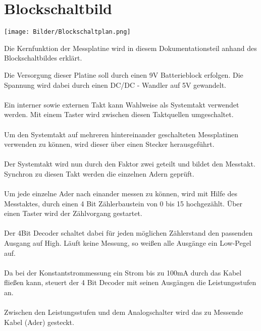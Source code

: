 \documentclass[a4paper,11pt]{scrartcl}
\begin{document}
\section{Blockschaltbild}
	
\begin{center}
\texttt{[image: Bilder/Blockschaltplan.png]}
\end{center}

\newpage

\begin{center}
Die Kernfunktion der Messplatine wird in diesem Dokumentationsteil anhand des Blockschaltbildes erklärt. 
\end{center}

Die Versorgung dieser Platine soll durch einen 9V Batterieblock erfolgen. Die Spannung wird dabei durch einen DC/DC - Wandler auf 5V gewandelt.
\\
\\
Ein interner sowie externen Takt kann Wahlweise als Systemtakt verwendet werden. Mit einem Taster wird zwischen diesen Taktquellen umgeschaltet.
\\
\\
Um den Systemtakt auf mehreren hintereinander geschalteten Messplatinen verwenden zu können, wird dieser über einen Stecker herausgeführt.
\\
\\
Der Systemtakt wird nun durch den Faktor zwei geteilt und bildet den Messtakt. Synchron zu diesen Takt werden die einzelnen Adern geprüft.
\\
\\
Um jede einzelne Ader nach einander messen zu können, wird mit Hilfe des Messtaktes, durch einen 4 Bit Zählerbaustein von 0 bis 15 hochgezählt. Über einen Taster wird der Zählvorgang gestartet.
\\
\\
Der 4Bit Decoder schaltet dabei für jeden möglichen Zählerstand den passenden Ausgang auf High. Läuft keine Messung, so weißen alle Ausgänge ein Low-Pegel auf. 
\\
\\
Da bei der Konstantstrommessung ein Strom bis zu 100mA durch das Kabel fließen kann, steuert der 4 Bit Decoder mit seinen Ausgängen die Leistungsstufen an.
\\
\\
Zwischen den Leistungsstufen und dem Analogschalter wird das zu Messende Kabel  (Ader) gesteckt. 
\\
\\
\end{document}
